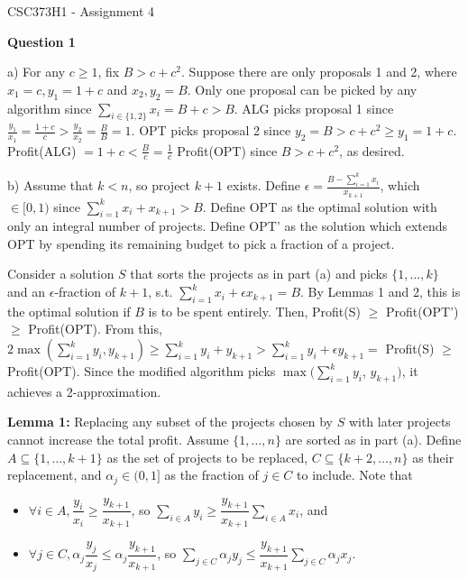 \documentclass[11pt]{article}
\begin{document}
\begin{center}
    {\Large CSC373H1 - Assignment 4}
\end{center}

\textbf{Question 1}

a) For any $c\geq 1$, fix $B>c+c^2$. Suppose there are only proposals 1 and 2, where $x_1=c,y_1=1+c$ and $x_2,y_2=B$. Only one proposal can be picked by any algorithm since $\sum_{i\in\{1,2\}} x_i=B+c>B$. ALG picks proposal 1 since $\frac{y_1}{x_1}=\frac{1+c}{c}>\frac{y_2}{x_2}=\frac{B}{B}=1$. OPT picks proposal 2 since $y_2=B>c+c^2\geq y_1=1+c$. Profit(ALG) $=1+c<\frac{B}{c}=\frac{1}{c}$ Profit(OPT) since $B>c+c^2$, as desired.

b) Assume that $k<n$, so project $k+1$ exists. Define $\epsilon=\frac{B-\sum_{i=1}^k x_i}{x_{k+1}}$, which $\in[0,1)$ since $\sum_{i=1}^k x_i+x_{k+1}>B$. Define OPT as the optimal solution with only an integral number of projects. Define OPT' as the solution which extends OPT by spending its remaining budget to pick a fraction of a project.

Consider a solution $S$ that sorts the projects as in part (a) and picks $\{1,\ldots,k\}$ and an $\epsilon$-fraction of $k+1$, s.t. $\sum_{i=1}^k x_i+\epsilon x_{k+1}=B$. By Lemmas 1 and 2, this is the optimal solution if $B$ is to be spent entirely. Then, Profit(S) $\geq$ Profit(OPT') $\geq$ Profit(OPT). From this, $2\max(\sum_{i=1}^k y_i,y_{k+1})\geq\sum_{i=1}^k y_i+y_{k+1}>\sum_{i=1}^k y_i+\epsilon y_{k+1}=$ Profit(S) $\geq$ Profit(OPT). Since the modified algorithm picks $\max(\sum_{i=1}^k y_i$, $y_{k+1})$, it achieves a 2-approximation.

\textbf{Lemma 1:} Replacing any subset of the projects chosen by $S$ with later projects cannot increase the total profit. Assume $\{1,\ldots,n\}$ are sorted as in part (a). Define $A\subseteq\{1,\ldots,k+1\}$ as the set of projects to be replaced, $C\subseteq\{k+2,\ldots,n\}$ as their replacement, and $\alpha_j\in(0,1]$ as the fraction of $j\in C$ to include. Note that

\begin{itemize}
    \item $\forall i\in A, \dfrac{y_i}{x_i}\geq\dfrac{y_{k+1}}{x_{k+1}}$, so $\sum_{i\in A} y_i\geq\dfrac{y_{k+1}}{x_{k+1}}\sum_{i\in A} x_i$, and
    \item $\forall j\in C,\alpha_j\dfrac{y_j}{x_j}\leq\alpha_j\dfrac{y_{k+1}}{x_{k+1}}$, so $\sum_{j\in C} \alpha_jy_j\leq \dfrac{y_{k+1}}{x_{k+1}}\sum_{j\in C} \alpha_jx_j$.
\end{itemize}
\end{document}
